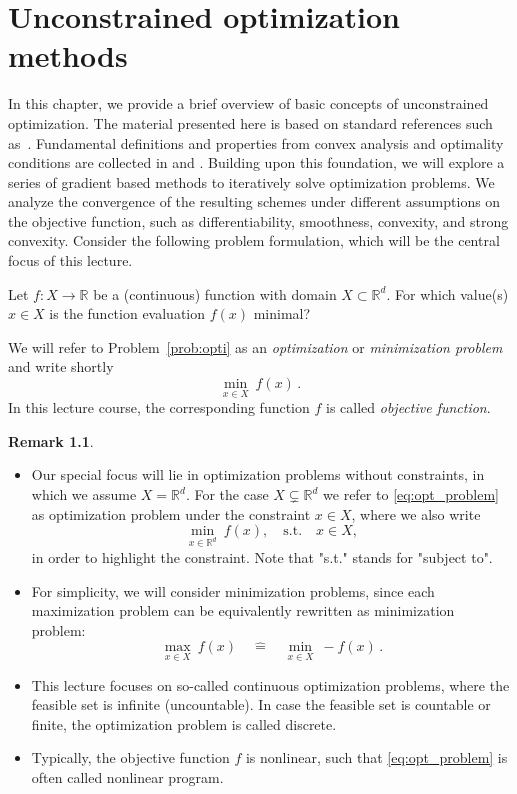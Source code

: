 \documentclass[12pt,openany]{book}
\theoremstyle{definition}
\newtheorem{remark}[thm]{Remark}
\theoremstyle{definition}
\newcommand{\R}{\mathbb{R}}
\begin{document}
\chapter{Unconstrained optimization methods}\label{ch:unOpt}
In this chapter, we provide a brief overview of basic concepts of unconstrained optimization. The material presented here is based on standard references such as~\cite{DPB15,N2018,Lan2021}. Fundamental definitions and properties from convex analysis and optimality conditions are collected in  and . Building upon this foundation, we will explore a series of gradient based methods to iteratively solve optimization problems. We analyze the convergence of the resulting schemes under different assumptions on the objective
function, such as differentiability, smoothness, convexity, and strong convexity. Consider the following problem formulation, which will be the central focus of this lecture.
\begin{prob}\label{prob:opti}
Let $f:X\to\R$ be a (continuous) function with domain $X\subset \R^d$. For which value(s) $x\in X$ is the function evaluation $f(x)$ minimal? 
\end{prob}
We will refer to Problem~\ref{prob:opti} as an \textit{optimization} or \textit{minimization problem} and write shortly
\begin{equation}\label{eq:opt_problem}
\min_{x\in X}\ f(x)\, .
\end{equation}
In this lecture course, the corresponding function $f$ is called \textit{objective function}. 
\begin{remark}
\begin{itemize}
\item Our special focus will lie in optimization problems without constraints, in which we assume $X=\R^d$. For the case $X\subsetneq \R^d$ we refer to \eqref{eq:opt_problem} as optimization problem under the constraint $x\in X$, where we also write
\begin{equation*}
\min_{x\in \R^d}\ f(x),\quad \text{s.t.}\quad x\in X, 
\end{equation*}
in order to highlight the constraint. Note that "s.t." stands for "subject to".
\item For simplicity, we will consider minimization problems, since each maximization problem can be equivalently rewritten as minimization problem: 
\[\max_{x\in X}\ f(x) \quad \widehat{=} \quad \min_{x\in X}\ -f(x)\, .\]
\item This lecture focuses on so-called continuous optimization problems, where the feasible set is infinite (uncountable). In case the feasible set is countable or finite, the optimization problem is called discrete.
\item Typically, the objective function $f$ is nonlinear, such that \eqref{eq:opt_problem} is often called nonlinear program.
\end{itemize}
\end{remark}
\end{document}
